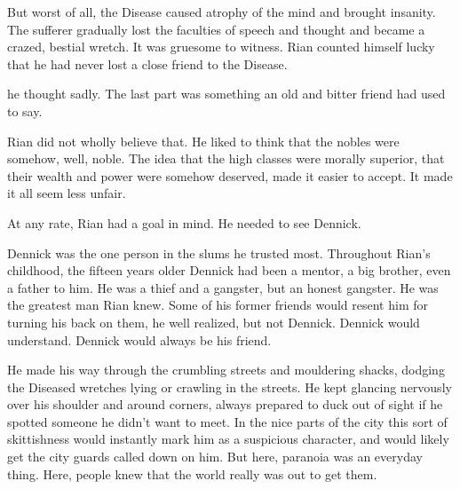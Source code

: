 But worst of all, the Disease caused atrophy of the mind and brought insanity.
The sufferer gradually lost the faculties of speech and thought and became a crazed, bestial wretch. 
It was gruesome to witness. 
Rian counted himself lucky that he had never lost a close friend to the Disease. 

 he thought sadly. 
The last part was something an old and bitter friend had used to say. 

Rian did not wholly believe that. 
He liked to think that the nobles were somehow, well, noble. 
The idea that the high classes were morally superior, that their wealth and power were somehow deserved, made it easier to accept. 
It made it all seem less unfair. 



\begin{comment}
\subsection{Dennick}
\end{comment}

At any rate, Rian had a goal in mind. 
He needed to see Dennick. 

Dennick was the one person in the slums he trusted most. 
Throughout Rian's childhood, the fifteen years older Dennick had been a mentor, a big brother, even a father to him. 
He was a thief and a gangster, but an honest gangster. 
He was the greatest man Rian knew. 
Some of his former friends would resent him for turning his back on them, he well realized, but not Dennick. 
Dennick would understand. 
Dennick would always be his friend. 

He made his way through the crumbling streets and mouldering shacks, dodging the Diseased wretches lying or crawling in the streets. 
He kept glancing nervously over his shoulder and around corners, always prepared to duck out of sight if he spotted someone he didn't want to meet. 
In the nice parts of the city this sort of skittishness would instantly mark him as a suspicious character, and would likely get the city guards called down on him. 
But here, paranoia was an everyday thing. 
Here, people knew that the world really was out to get them. 

